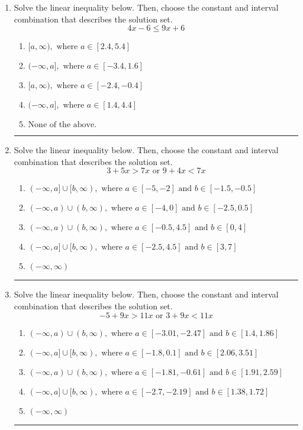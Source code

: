 \documentclass[14pt]{extbook}
\newcommand{\litem}[1]{\item#1\hspace*{-1cm}\rule{\textwidth}{0.4pt}}
\begin{document}
\begin{enumerate}
\litem{
Solve the linear inequality below. Then, choose the constant and interval combination that describes the solution set.\[ 4x -6 \leq 9x + 6 \]\begin{enumerate}[label=\Alph*.]
\item \( [a, \infty), \text{ where } a \in [2.4, 5.4] \)
\item \( (-\infty, a], \text{ where } a \in [-3.4, 1.6] \)
\item \( [a, \infty), \text{ where } a \in [-2.4, -0.4] \)
\item \( (-\infty, a], \text{ where } a \in [1.4, 4.4] \)
\item \( \text{None of the above}. \)

\end{enumerate} }
\litem{
Solve the linear inequality below. Then, choose the constant and interval combination that describes the solution set.\[ 3 + 5 x > 7 x \text{ or } 9 + 4 x < 7 x \]\begin{enumerate}[label=\Alph*.]
\item \( (-\infty, a] \cup [b, \infty), \text{ where } a \in [-5, -2] \text{ and } b \in [-1.5, -0.5] \)
\item \( (-\infty, a) \cup (b, \infty), \text{ where } a \in [-4, 0] \text{ and } b \in [-2.5, 0.5] \)
\item \( (-\infty, a) \cup (b, \infty), \text{ where } a \in [-0.5, 4.5] \text{ and } b \in [0, 4] \)
\item \( (-\infty, a] \cup [b, \infty), \text{ where } a \in [-2.5, 4.5] \text{ and } b \in [3, 7] \)
\item \( (-\infty, \infty) \)

\end{enumerate} }
\litem{
Solve the linear inequality below. Then, choose the constant and interval combination that describes the solution set.\[ -5 + 9 x > 11 x \text{ or } 3 + 9 x < 11 x \]\begin{enumerate}[label=\Alph*.]
\item \( (-\infty, a) \cup (b, \infty), \text{ where } a \in [-3.01, -2.47] \text{ and } b \in [1.4, 1.86] \)
\item \( (-\infty, a] \cup [b, \infty), \text{ where } a \in [-1.8, 0.1] \text{ and } b \in [2.06, 3.51] \)
\item \( (-\infty, a) \cup (b, \infty), \text{ where } a \in [-1.81, -0.61] \text{ and } b \in [1.91, 2.59] \)
\item \( (-\infty, a] \cup [b, \infty), \text{ where } a \in [-2.7, -2.19] \text{ and } b \in [1.38, 1.72] \)
\item \( (-\infty, \infty) \)


\end{enumerate}}
\end{enumerate}
\end{document}
